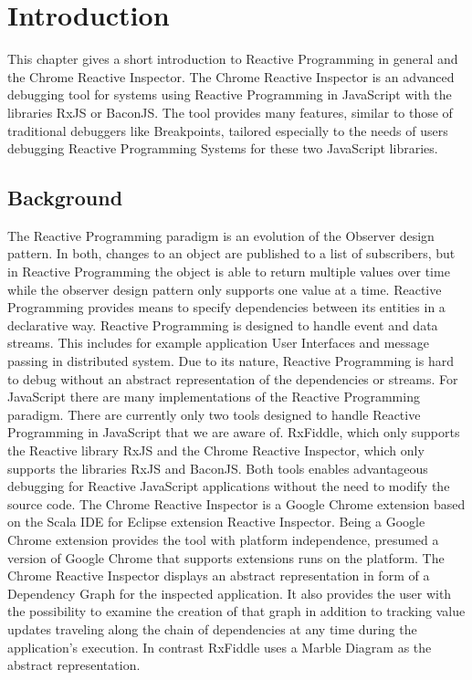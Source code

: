 \chapter{Introduction} \label{ch:Introduction}
This chapter gives a short introduction to Reactive Programming in general and the Chrome Reactive Inspector. The Chrome Reactive Inspector is an advanced debugging tool for systems using Reactive Programming in JavaScript with the libraries RxJS or BaconJS. The tool provides many features, similar to those of traditional debuggers like Breakpoints, tailored especially to the needs of users debugging Reactive Programming Systems for these two JavaScript libraries.

\section{Background}
The Reactive Programming paradigm is an evolution of the Observer design pattern. In both, changes to an object are published to a list of subscribers, but in Reactive Programming the object is able to return multiple values over time while the observer design pattern only supports one value at a time. Reactive Programming provides means to specify dependencies between its entities in a declarative way. Reactive Programming is designed to handle event and data streams. This includes for example application User Interfaces and message passing in distributed system. Due to its nature, Reactive Programming is hard to debug without an abstract representation of the dependencies or streams.
For JavaScript there are many implementations of the Reactive Programming paradigm. There are currently only two tools designed to handle Reactive Programming in JavaScript that we are aware of. RxFiddle, which only supports the Reactive library RxJS and the Chrome Reactive Inspector, which only supports the libraries RxJS and BaconJS. Both tools enables advantageous debugging for Reactive JavaScript applications without the need to modify the source code. The Chrome Reactive Inspector is a Google Chrome extension based on the Scala IDE for Eclipse extension Reactive Inspector. Being a Google Chrome extension provides the tool with platform independence, presumed a version of Google Chrome that supports extensions runs on the platform.
The Chrome Reactive Inspector displays an abstract representation in form of a Dependency Graph for the inspected application. It also provides the user with the possibility to examine the creation of that graph in addition to tracking value updates traveling along the chain of dependencies at any time during the application's execution.%
In contrast RxFiddle uses a Marble Diagram as the abstract representation.


